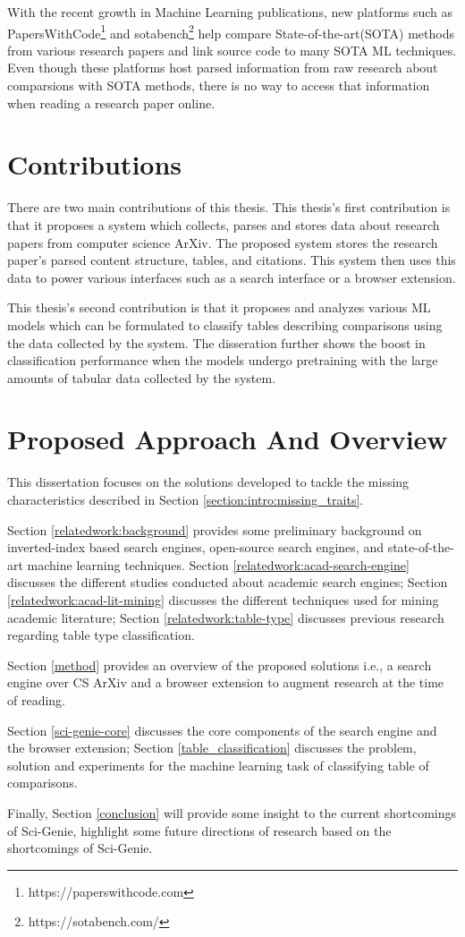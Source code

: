 With the recent growth in Machine Learning publications, new platforms such as PapersWithCode\footnote{https://paperswithcode.com} and sotabench\footnote{https://sotabench.com/} help compare State-of-the-art(SOTA) methods from various research papers and link source code to many SOTA ML techniques. Even though these platforms host parsed information from raw research about comparsions with SOTA methods, there is no way to access that information when reading a research paper online. 

\section{Contributions}
There are two main contributions of this thesis. This thesis's first contribution is that it proposes a system which collects, parses and stores data about research papers from computer science ArXiv. The proposed system stores the research paper's parsed content structure, tables, and citations. This system then uses this data to power various interfaces such as a search interface or a browser extension. 

This thesis's second contribution is that it proposes and analyzes various ML models which can be formulated to classify tables describing comparisons using the data collected by the system. The disseration further shows the boost in classification performance when the models undergo pretraining with the large amounts of tabular data collected by the system. 

\section{Proposed Approach And Overview}
This dissertation focuses on the solutions developed to tackle the missing characteristics described in Section \ref{section:intro:missing_traits}. 

Section \ref{relatedwork:background} provides some preliminary background on inverted-index based search engines, open-source search engines, and state-of-the-art machine learning techniques.
Section \ref{relatedwork:acad-search-engine} discusses the different studies conducted about academic search engines; Section \ref{relatedwork:acad-lit-mining} discusses the different techniques used for mining academic literature; Section \ref{relatedwork:table-type} discusses previous research regarding table type classification. 

Section \ref{method} provides an overview of the proposed solutions i.e., a search engine over CS ArXiv and a browser extension to augment research at the time of reading. 

Section \ref{sci-genie-core} discusses the core components of the search engine and the browser extension; Section \ref{table_classification} discusses the problem, solution and experiments for the machine learning task of classifying table of comparisons.

Finally, Section \ref{conclusion} will provide some insight to the current shortcomings of Sci-Genie, highlight some future directions of research based on the shortcomings of Sci-Genie. 